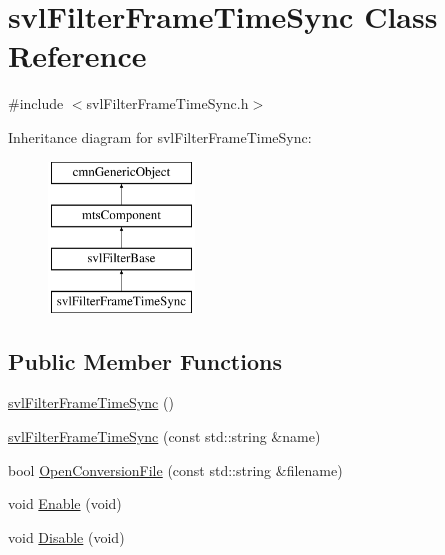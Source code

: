 \hypertarget{classsvl_filter_frame_time_sync}{}\section{svl\+Filter\+Frame\+Time\+Sync Class Reference}
\label{classsvl_filter_frame_time_sync}


{\ttfamily \#include $<$svl\+Filter\+Frame\+Time\+Sync.\+h$>$}

Inheritance diagram for svl\+Filter\+Frame\+Time\+Sync\+:\begin{figure}[H]
\begin{center}
\leavevmode
\includegraphics[height=4.000000cm]{dd/d8b/classsvl_filter_frame_time_sync}
\end{center}
\end{figure}
\subsection*{Public Member Functions}
\begin{DoxyCompactItemize}
\item 
\hyperlink{classsvl_filter_frame_time_sync_ad2c7fddf56a45877ad618c2b120b313b}{svl\+Filter\+Frame\+Time\+Sync} ()
\item 
\hyperlink{classsvl_filter_frame_time_sync_a6aeb2c033e06ee808ff33ce8685f6f5e}{svl\+Filter\+Frame\+Time\+Sync} (const std\+::string \&name)
\item 
bool \hyperlink{classsvl_filter_frame_time_sync_a7831489f935622201e7d62c31bde6e55}{Open\+Conversion\+File} (const std\+::string \&filename)
\item 
void \hyperlink{classsvl_filter_frame_time_sync_a5c209c39f49db44fea13d897912147aa}{Enable} (void)
\item 
void \hyperlink{classsvl_filter_frame_time_sync_a51f92f69df3bda0cabe4c3c1022d67fd}{Disable} (void)
\end{DoxyCompactItemize}
